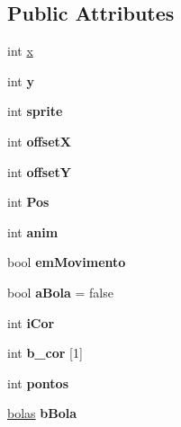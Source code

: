 \subsection*{Public Attributes}
\begin{DoxyCompactItemize}
\item 
int \hyperlink{classjogador_abaa4b2d67404ee9cfd542d481930c222}{x}
\item 
\hypertarget{classjogador_af3e719a0fff8f042012cfd6c661a9d53}{int {\bfseries y}}\label{classjogador_af3e719a0fff8f042012cfd6c661a9d53}

\item 
\hypertarget{classjogador_a7f622ac60ab4a9bfca4ff751b857eec7}{int {\bfseries sprite}}\label{classjogador_a7f622ac60ab4a9bfca4ff751b857eec7}

\item 
\hypertarget{classjogador_a772757daa504edf734cae3e6fe2318cf}{int {\bfseries offset\-X}}\label{classjogador_a772757daa504edf734cae3e6fe2318cf}

\item 
\hypertarget{classjogador_a7a4e2ee082d26c2d82a502ee3df0b0d6}{int {\bfseries offset\-Y}}\label{classjogador_a7a4e2ee082d26c2d82a502ee3df0b0d6}

\item 
\hypertarget{classjogador_a4b1bf4fe3c22c882cdefd52f4d6329d7}{int {\bfseries Pos}}\label{classjogador_a4b1bf4fe3c22c882cdefd52f4d6329d7}

\item 
\hypertarget{classjogador_a580bd6a309bb273c9bd0e5e3f809668e}{int {\bfseries anim}}\label{classjogador_a580bd6a309bb273c9bd0e5e3f809668e}

\item 
\hypertarget{classjogador_a093b1be77bc65dee9b07dc36465ce5f9}{bool {\bfseries em\-Movimento}}\label{classjogador_a093b1be77bc65dee9b07dc36465ce5f9}

\item 
\hypertarget{classjogador_aed8b05d8b15f23f38e842fc427a195b4}{bool {\bfseries a\-Bola} = false}\label{classjogador_aed8b05d8b15f23f38e842fc427a195b4}

\item 
\hypertarget{classjogador_a5d3050751553fe1f2affce7c2de1f7e7}{int {\bfseries i\-Cor}}\label{classjogador_a5d3050751553fe1f2affce7c2de1f7e7}

\item 
\hypertarget{classjogador_a2be3879f47e2435a3b9f5072c110a314}{int {\bfseries b\-\_\-cor} \mbox{[}1\mbox{]}}\label{classjogador_a2be3879f47e2435a3b9f5072c110a314}

\item 
\hypertarget{classjogador_a548374a0ac1ae937651c7e07823d5294}{int {\bfseries pontos}}\label{classjogador_a548374a0ac1ae937651c7e07823d5294}

\item 
\hypertarget{classjogador_a35ea8d76b7935aaf3553b02346faa9f3}{\hyperlink{classbolas}{bolas} {\bfseries b\-Bola}}\label{classjogador_a35ea8d76b7935aaf3553b02346faa9f3}

\end{DoxyCompactItemize}


